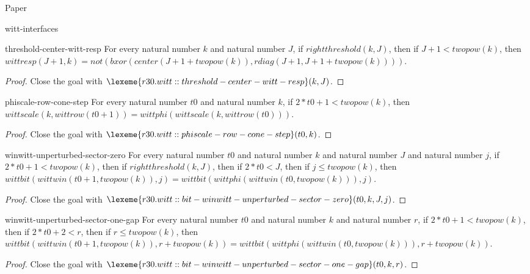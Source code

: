 \begin{lexlean}{Paper}
\begin{section}{witt-interfaces}
  \begin{theorem}{threshold-center-witt-resp}
  For every natural number \(k\) and natural number \(J\), if \(rightthreshold(k, J)\), then if \(J + 1 < twopow(k)\), then \(wittresp(J + 1, k) = not(bxor(center(J + 1 + twopow(k)), rdiag(J + 1, J + 1 + twopow(k))))\).
  \begin{proof}
  Close the goal with \(\lexeme{r30.witt::threshold-center-witt-resp}(k, J)\).
  \end{proof}
  \end{theorem}

  \begin{theorem}{phiscale-row-cone-step}
  For every natural number \(t0\) and natural number \(k\), if \(2 * t0 + 1 < twopow(k)\), then \(wittscale(k, wittrow(t0 + 1)) = wittphi(wittscale(k, wittrow(t0)))\).
  \begin{proof}
  Close the goal with \(\lexeme{r30.witt::phiscale-row-cone-step}(t0, k)\).
  \end{proof}
  \end{theorem}

  \begin{theorem}{winwitt-unperturbed-sector-zero}
  For every natural number \(t0\) and natural number \(k\) and natural number \(J\) and natural number \(j\), if \(2 * t0 + 1 < twopow(k)\), then if \(rightthreshold(k, J)\), then if \(2 * t0 < J\), then if \(j ≤ twopow(k)\), then \(wittbit(wittwin(t0 + 1, twopow(k)), j) = wittbit(wittphi(wittwin(t0, twopow(k))), j)\).
  \begin{proof}
  Close the goal with \(\lexeme{r30.witt::bit-winwitt-unperturbed-sector-zero}(t0, k, J, j)\).
  \end{proof}
  \end{theorem}

  \begin{theorem}{winwitt-unperturbed-sector-one-gap}
  For every natural number \(t0\) and natural number \(k\) and natural number \(r\), if \(2 * t0 + 1 < twopow(k)\), then if \(2 * t0 + 2 < r\), then if \(r ≤ twopow(k)\), then \(wittbit(wittwin(t0 + 1, twopow(k)), r + twopow(k)) = wittbit(wittphi(wittwin(t0, twopow(k))), r + twopow(k))\).
  \begin{proof}
  Close the goal with \(\lexeme{r30.witt::bit-winwitt-unperturbed-sector-one-gap}(t0, k, r)\).
  \end{proof}
  \end{theorem}


\end{section}
\end{lexlean}
